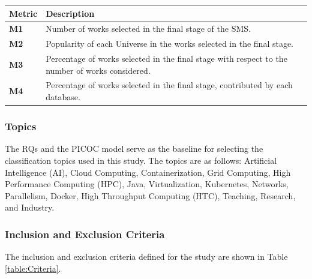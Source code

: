 \begin{table}
	{\begin{tabular}{p{1cm}p{6.8cm}} \toprule
			\textbf{Metric} & \textbf{Description}                                                                            \\
			\midrule
			\textbf{M1}     & Number of works selected in the final stage of the SMS.                                         \\
			\textbf{M2}     & Popularity of each Universe in the works selected in the final stage.                           \\
			\textbf{M3}     & Percentage of works selected in the final stage with respect to the number of works considered. \\
			\textbf{M4}     & Percentage of works selected in the final stage, contributed by each database.                  \\
			\bottomrule
		\end{tabular}}
	\label{table:Metrics}
\end{table}

\subsubsection{Topics}
The RQs and the PICOC model serve as the baseline for selecting the classification topics used in this study. The topics are as follows: Artificial Intelligence (AI), Cloud Computing, Containerization, Grid Computing, High Performance Computing (HPC), Java, Virtualization, Kubernetes, Networks, Parallelism, Docker, High Throughput Computing (HTC), Teaching, Research, and Industry.

\subsubsection{Inclusion and Exclusion Criteria}
The inclusion and exclusion criteria defined for the study are shown in Table \ref{table:Criteria}.

